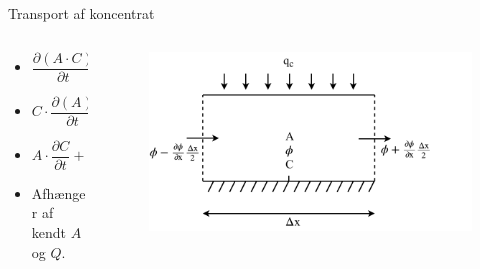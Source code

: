\begin{frame}{Transport af koncentrat}{}
	\vfill\vfill\centering
\begin{columns}
	\begin{column}{0.4\textwidth}
		\begin{itemize}
			\vspace{7mm}
			\item<1-> $	\dfrac{\partial (A \cdot C)}{\partial t} + \dfrac{\partial (Q \cdot C)}{\partial x} = 0$
			\vspace{4mm}
			\item<2-> $ C \cdot \dfrac{\partial (A)}{\partial t} + C \cdot \dfrac{\partial (Q )}{\partial x} = 0$
			\vspace{4mm}
			\item<3-> $	A \cdot \dfrac{\partial C}{\partial t} + Q \cdot \dfrac{\partial C}{\partial x} = 0$
			\vspace{4mm}
			\item<4-> Afhænger af kendt $A$ og $Q$.
		\end{itemize}
	\end{column}
	
	\begin{column}{0.48\textwidth}
		\begin{figure}[H]
			\centering
			\includegraphics[width=1.1\textwidth]{Sections/pictures/poopvolume.pdf}
		\end{figure}
	\end{column}
\end{columns}


\vfill\vfill		
\end{frame}

